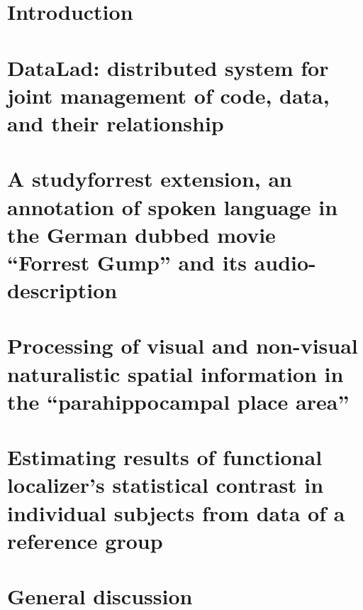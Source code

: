 \documentclass[english,12pt]{report}
\begin{document}
\begin{spacing}{1.5}
\chapter{Introduction}
\setcounter{page}{1}







\chapter{DataLad: distributed system for joint management of code, data, and
their relationship}






\chapter{A studyforrest extension, an annotation of spoken language in the
German dubbed movie ``Forrest Gump'' and its audio-description}






\chapter{Processing of visual and non-visual naturalistic spatial information in
the ``parahippocampal place area''}




\chapter{Estimating results of functional localizer's statistical contrast in
individual subjects from data of a reference group}





\chapter{General discussion}


\end{spacing}
\end{document}
